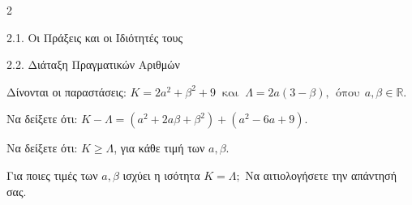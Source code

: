 \begin{ylh}{2}
    \item 2.1. Οι Πράξεις και οι Ιδιότητές τους
    \item 2.2. Διάταξη Πραγματικών Αριθμών
\end{ylh}
Δίνονται οι παραστάσεις: $K = 2a^{2} + \beta^{2} + 9\ \text{ και }\ \Lambda = 2a(3 - \beta),\ \ \text{όπου}\ \ a,\beta \in \mathbb{R.}$
\begin{alist}
\item Να δείξετε ότι: $K - \Lambda = \left( a^{2} + 2a\beta + \beta^{2} \right) + \left( a^{2} - 6a + 9 \right)$.
\item Να δείξετε ότι: $K \geq \Lambda$, για κάθε τιμή των $a,\beta$.
\item Για ποιες τιμές των $a,\beta$ ισχύει η ισότητα $K = \Lambda;$ Να αιτιολογήσετε την απάντησή σας.
\end{alist}

